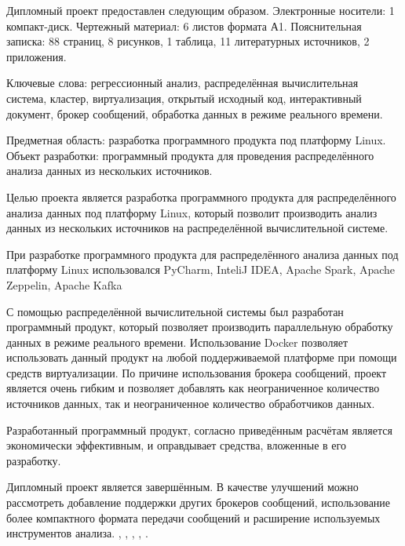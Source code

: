 \label{sec:ref}

Дипломный проект предоставлен следующим образом. Электронные носители: 1
компакт-диск. Чертежный материал: 6 листов формата А1. Пояснительная записка:
88 страниц, 8 рисунков, 1 таблица, 11 литературных источников, 2 приложения.

Ключевые слова: регрессионный анализ, распределённая вычислительная система, кластер, виртуализация, открытый исходный код, интерактивный документ, брокер сообщений, обработка данных в режиме реального времени.

Предметная область: разработка программного продукта под платформу Linux.
Объект разработки: программный продукта для проведения распределённого анализа данных из нескольких источников.

Целью проекта является разработка программного продукта для распределённого анализа данных под платформу Linux, который позволит производить анализ данных из нескольких источников на распределённой вычислительной системе.

При разработке программного продукта для распределённого анализа данных под платформу Linux использовался PyCharm, InteliJ IDEA, Apache Spark, Apache Zeppelin, Apache Kafka

С помощью распределённой вычислительной системы был разработан программный продукт, который позволяет производить параллельную обработку данных в режиме реального времени.
Использование Docker позволяет использовать данный продукт на любой поддерживаемой платформе при помощи средств виртуализации.
По причине использования брокера сообщений, проект является очень гибким и позволяет добавлять как неограниченное количество источников данных, так и неограниченное количество обработчиков данных.

Разработанный программный продукт, согласно приведённым расчётам является экономически эффективным, и оправдывает средства, вложенные в его разработку.

Дипломный проект является завершённым. В качестве улучшений можно рассмотреть добавление поддержки других брокеров сообщений, использование более компактного формата передачи сообщений и расширение используемых инструментов анализа.
\insertNumPagesText ,
\insertNumFiguresText , \insertNumTablesText ,
\insertNumBibElementsText ,
\insertNumAnnexesText .

\newpage
